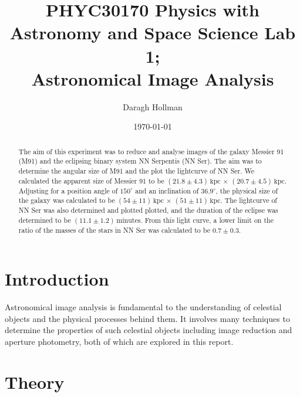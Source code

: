 \documentclass[%
reprint,
amsmath,amssymb,
aps,
]{revtex4-2}
\begin{document}
	
	
	\title{PHYC30170 Physics with Astronomy and Space Science Lab 1;\\Astronomical Image Analysis}%
	
	\author{Daragh Hollman}
	
	\date{\today}
	
	\begin{abstract}
		The aim of this experiment was to reduce and analyse images of the galaxy Messier 91 (M91) and the eclipsing binary system NN Serpentis (NN Ser). The aim was to determine the angular size of M91 and the plot the lightcurve of NN Ser. We calculated the apparent size of Messier 91 to be $\left(21.8 \pm 4.3\right) \,\text{kpc}$ $\times$ $\left(20.7 \pm 4.5\right) \,\text{kpc}$. Adjusting for a position angle of $150^\circ$ and an inclination of $36.9^\circ$, the physical size of the galaxy was calculated to be $\left(54 \pm 11\right) \,\text{kpc}$ $\times$ $\left(51 \pm 11\right) \,\text{kpc}$. The lightcurve of NN Ser was also determined and plotted plotted, and the duration of the eclipse was determined to be $(11.1 \pm 1.2)\,\text{minutes}$. From this light curve, a lower limit on the ratio of the masses of the stars in NN Ser was calculated to be $0.7 \pm 0.3$.
	\end{abstract}

	\maketitle
	
	\section{Introduction}

		Astronomical image analysis is fundamental to the understanding of celestial objects and the physical processes behind them. It involves many techniques to determine the properties of such celestial objects including image reduction and aperture photometry, both of which are explored in this report.
	
	
	\section{Theory}
\end{document}
